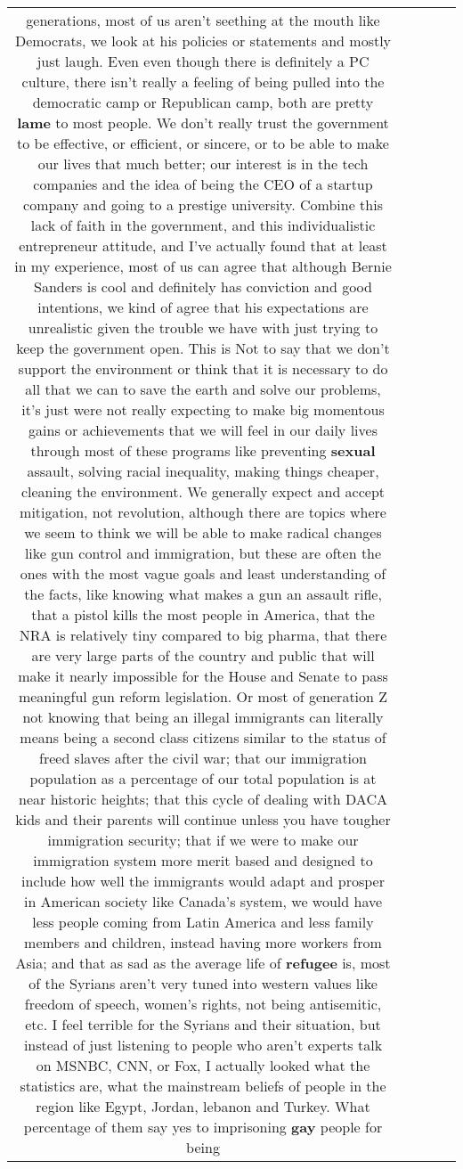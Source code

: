 \documentclass[11pt]{article}
\newlength\mylength
\begin{document}
\begin{center}
\begin{longtable}{|C{.65\mylength}|C{.30\mylength}|C{.12\mylength}|C{.12\mylength}|C{.12\mylength}|}
generations, most of us aren't seething at the mouth like Democrats, we look at his policies or statements and mostly just laugh. Even even though there is definitely a PC culture, there isn't really a feeling of being pulled into the democratic camp or Republican camp, both are pretty \textbf{lame} to most people. We don't really trust the government to be effective, or efficient, or sincere, or to be able to make our lives that much better; our interest is in the tech companies and the idea of being the CEO of a startup company and going to a prestige university. Combine this lack of faith in the government, and this individualistic entrepreneur attitude, and I've actually found that at least in my experience, most of us can agree that although Bernie Sanders is cool and definitely has conviction and good intentions, we kind of agree that his expectations are unrealistic given the trouble we have with just trying to keep the government open. This is Not to say that we don't support the environment or think that it is necessary to do all that we can to save the earth and solve our problems, it's just were not really expecting to make big momentous gains or achievements that we will feel in our daily lives through most of these programs like preventing \textbf{sexual} assault, solving racial inequality, making things cheaper, cleaning the environment. We generally expect and accept mitigation, not revolution, although there are topics where we seem to think we will be able to make radical changes like gun control and immigration, but these are often the ones with the most vague goals and least understanding of the facts,  like knowing what makes a gun an assault rifle, that a pistol kills the most people in America, that the NRA is relatively tiny compared to big pharma, that there are very large parts of the country and public that will make it nearly impossible  for the House and Senate  to pass meaningful gun reform legislation. Or most of generation Z not knowing that being an illegal immigrants  can literally means being a second class citizens similar to the status of freed slaves after the civil war; that our immigration population as a percentage of our total population is at near historic heights; that this cycle of dealing with DACA kids and their parents will continue unless you have tougher immigration security; that if we were to make our immigration system more merit based and designed to include how well the immigrants would adapt and prosper in American society like Canada's system, we would have less people coming from Latin America and less family members and children, instead having more workers from Asia; and that as sad as the average life of \textbf{refugee} is, most of the Syrians aren't very tuned into western values like freedom of speech, women's rights, not being antisemitic, etc. I feel terrible for the Syrians and their situation, but instead of just listening to people who aren't experts talk on MSNBC, CNN, or Fox, I actually looked what the statistics are, what the mainstream beliefs of people in the region like Egypt, Jordan, lebanon and Turkey. What percentage of them say yes to imprisoning \textbf{g\textbf{ay}} people for being 
\end{longtable}
\end{center}
\end{document}
